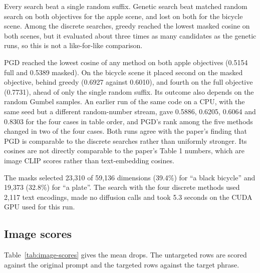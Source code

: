 \documentclass[11pt]{article}
\begin{document}
Every search beat a single random suffix. Genetic search beat matched random search on both objectives for the apple scene, and lost on both for the bicycle scene. Among the discrete searches, greedy reached the lowest masked cosine on both scenes, but it evaluated about three times as many candidates as the genetic runs, so this is not a like-for-like comparison.

PGD reached the lowest cosine of any method on both apple objectives (0.5154 full and 0.5389 masked). On the bicycle scene it placed second on the masked objective, behind greedy (0.6927 against 0.6010), and fourth on the full objective (0.7731), ahead of only the single random suffix. Its outcome also depends on the random Gumbel samples. An earlier run of the same code on a CPU, with the same seed but a different random-number stream, gave 0.5886, 0.6205, 0.6064 and 0.8303 for the four cases in table order, and PGD's rank among the five methods changed in two of the four cases. Both runs agree with the paper's finding that PGD is comparable to the discrete searches rather than uniformly stronger. Its cosines are not directly comparable to the paper's Table 1 numbers, which are image CLIP scores rather than text-embedding cosines.

The masks selected 23,310 of 59,136 dimensions (39.4\%) for ``a black bicycle'' and 19,373 (32.8\%) for ``a plate''. The search with the four discrete methods used 2,117 text encodings, made no diffusion calls and took 5.3 seconds on the CUDA GPU used for this run.

\subsection{Image scores}

Table~\ref{tab:image-scores} gives the mean drops. The untargeted rows are scored against the original prompt and the targeted rows against the target phrase.
\end{document}
